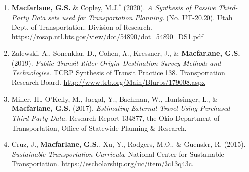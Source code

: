 \documentclass[margin,line]{res}
\newif\ifdetail
\newcounter{enuminitialize}
\newenvironment{myenum}[1][]
{%
 \setcounter{enuminitialize}{#1}
 \addtocounter{enuminitialize}{2}
 \begin{enumerate}[left= 4pt, itemsep=12pt, start=\value{enuminitialize}, label=\arabic*\addtocounter{enumi}{-2}]
}
{%
 \end{enumerate}
}
\begin{document}
\begin{resume}
\begin{myenum}[7]
\item \textbf{Macfarlane, G.S.} \& Copley, M.J.$^*$ (2020). \textit{ A Synthesis of Passive Third-Party Data sets used for Transportation Planning.} (No. UT-20.20). Utah Dept. of Transportation. Division of Research. \url{https://rosap.ntl.bts.gov/view/dot/54890/dot_54890_DS1.pdf}

\item Zalewski, A., Sonenklar, D., Cohen, A., Kressner, J., \& \textbf{Macfarlane, G.S.} (2019). \textit{ Public Transit Rider Origin–Destination Survey Methods and Technologies}. TCRP Synthesis of Transit Practice 138. Transportation Research Board. \url{http://www.trb.org/Main/Blurbs/179008.aspx} \ifdetail Citations: 1  \fi

\item Miller, H., O'Kelly, M., Jaegal, Y., Bachman, W., Huntsinger, L., \& \textbf{Macfarlane, G.S.} (2017). \textit{Estimating External Travel Using Purchased Third-Party Data.} Research Report 134877, the Ohio Department of Transportation, Office of Statewide Planning \& Research. \ifdetail Citations: 1  \fi

\item Cruz, J., \textbf{Macfarlane, G.S.}, Xu, Y., Rodgers, M.O., \& Guensler, R. (2015). \textit{Sustainable Transportation Curricula}. National Center for Sustainable Transportation. \url{https://escholarship.org/uc/item/3c13q43c}.
\end{myenum}

\noindent\makebox[\linewidth]{\rule{\linewidth}{0.4pt}}

\end{resume}
\end{document}
